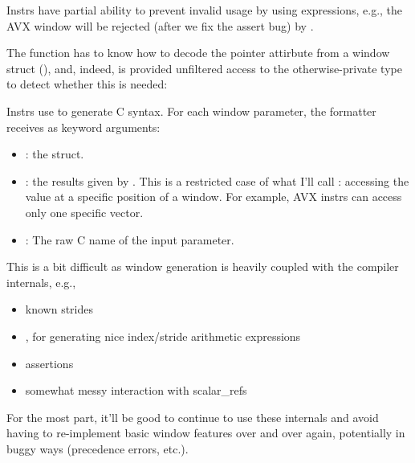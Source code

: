 \filbreak
Instrs have partial ability to prevent invalid usage by using  expressions, e.g., the AVX window  will be rejected (after we fix the assert bug) by .

\filbreak
The  function has to know how to decode the pointer attirbute from a window struct (), and, indeed, is provided unfiltered access to the otherwise-private  type to detect whether this is needed:



\filbreak
Instrs use  to generate C syntax.
For each window parameter, the formatter receives as keyword arguments:
\begin{itemize}
  \item {}: the  struct.
  \filbreak
  \item {}: the results given by .
    This is a restricted case of what I'll call : accessing the value at a specific position of a window.
    For example, AVX instrs can access only one specific  vector.
  \filbreak
  \item {}: The raw C name of the input parameter.
\end{itemize}

\filbreak
{}

This is a bit difficult as window generation is heavily coupled with the compiler internals, e.g.,

\begin{itemize}
  \item known strides
  \filbreak
  \item {}, for generating nice index/stride arithmetic expressions
  \filbreak
  \item assertions
  \filbreak
  \item somewhat messy interaction with scalar\_refs
\end{itemize}

\filbreak
For the most part, it'll be good to continue to use these internals and avoid having to re-implement basic window features over and over again, potentially in buggy ways (precedence errors, etc.).

